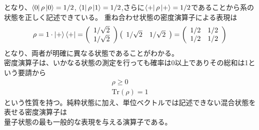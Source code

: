         となり、$\bra{0}\rho\ket{0}=1/2$, $\bra{1}\rho\ket{1}=1/2$,さらに$\bra{+}\rho\ket{+}=1/2$であることから系の状態を正しく記述できている。
        重ね合わせ状態の密度演算子による表現は
        \begin{equation*}
            \rho=1\cdot\ket{+}\bra{+}
            =\left(
                \begin{array}{c}
                  1/\sqrt2\\
                  1/\sqrt2
                \end{array}
              \right)
              \left(
                \begin{array}{cc}
                  1/\sqrt2 & 1/\sqrt2  
                \end{array}
              \right)
            =\left(
                \begin{array}{cc}
                  1/2 & 1/2\\
                  1/2 & 1/2\\
                \end{array}
              \right)
        \end{equation*}
        となり、両者が明確に異なる状態であることがわかる。\\
        密度演算子は、いかなる状態の測定を行っても確率は0以上でありその総和は1という要請から
        \begin{eqnarray}
            \rho \geq 0 \\
            \mathrm{Tr}(\rho)=1
        \end{eqnarray}
        という性質を持つ。純粋状態に加え、単位ベクトルでは記述できない混合状態を表せる密度演算子は\\
        量子状態の最も一般的な表現を与える演算子である。

